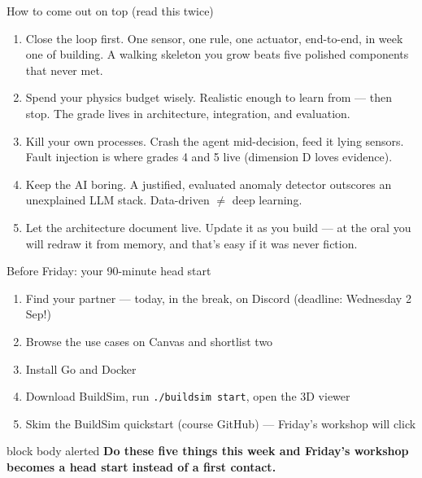 \documentclass[aspectratio=169]{beamer}
\newcommand{\hilite}[1]{\textcolor{accentColor}{#1}}
\newcommand{\subtle}[1]{\textcolor{subtleColor}{#1}}
\begin{document}
\begin{frame}{How to come out on top (read this twice)}
	\begin{enumerate}
		\setlength\itemsep{0.6em}
		\item \hilite{Close the loop first.} One sensor, one rule, one actuator, end-to-end, in week one
		of building. A walking skeleton you grow beats five polished components that never met.
		\item \hilite{Spend your physics budget wisely.} Realistic enough to learn from — then stop.
		The grade lives in architecture, integration, and evaluation.
		\item \hilite{Kill your own processes.} Crash the agent mid-decision, feed it lying sensors.
		Fault injection is where grades 4 and 5 live \subtle{(dimension D loves evidence)}.
		\item \hilite{Keep the AI boring.} A justified, evaluated anomaly detector outscores an
		unexplained LLM stack. Data-driven $\neq$ deep learning.
		\item \hilite{Let the architecture document live.} Update it as you build — at the oral you
		will redraw it from memory, and that's easy if it was never fiction.
	\end{enumerate}
\end{frame}

\begin{frame}{Before Friday: your 90-minute head start}
	\begin{enumerate}
		\setlength\itemsep{0.8em}
		\item \hilite{Find your partner} — today, in the break, on Discord \subtle{(deadline: Wednesday 2 Sep!)}
		\item \hilite{Browse the use cases} on Canvas and shortlist two
		\item Install \hilite{Go} and \hilite{Docker}
		\item Download BuildSim, run \hilite{\texttt{./buildsim start}}, open the 3D viewer
		\item \hilite{Skim the BuildSim quickstart} (course GitHub) — Friday's workshop will click
	\end{enumerate}
	\vspace{0.8em}
	\begin{beamercolorbox}[rounded=true,sep=8pt]{block body alerted}
		\color{mainColor}\textbf{Do these five things this week and Friday's workshop becomes a head start
		instead of a first contact.}
	\end{beamercolorbox}
\end{frame}
\end{document}
